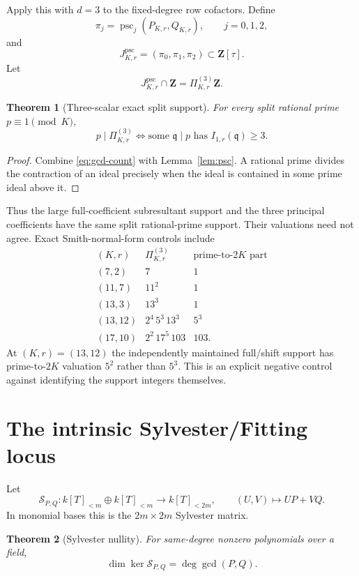 \documentclass[11pt]{article}
\newtheorem{theorem}{Theorem}[section]
\begin{document}
Apply this with $d=3$ to the fixed-degree row cofactors.  Define
\[
\pi_j=\operatorname{psc}_j(P_{K,r},Q_{K,r}),
\qquad j=0,1,2,
\]
and
\[
J^{\mathrm{psc}}_{K,r}=(\pi_0,\pi_1,\pi_2)
 \subset\mathbf Z[\tau].
\]
Let
\[
J^{\mathrm{psc}}_{K,r}\cap\mathbf Z
 =\Pi_{K,r}^{(3)}\mathbf Z.
\]

\begin{theorem}[Three-scalar exact split support]\label{thm:psc-support}
For every split rational prime $p\equiv1\pmod K$,
\[
p\mid\Pi_{K,r}^{(3)}
\iff
\text{some }\mathfrak q\mid p\text{ has }I_{1,r}(\mathfrak q)\ge3.
\]
\end{theorem}

\begin{proof}
Combine \eqref{eq:gcd-count} with Lemma~\ref{lem:psc}.  A rational prime divides
the contraction of an ideal precisely when the ideal is contained in some
prime ideal above it.
\end{proof}

Thus the large full-coefficient subresultant support and the three principal
coefficients have the same split rational-prime support.  Their valuations need
not agree.  Exact Smith-normal-form controls include
\[
\begin{array}{c|c|c}
(K,r)&\Pi_{K,r}^{(3)}&\text{prime-to-}2K\text{ part}\\\hline
(7,2)&7&1\\
(11,7)&11^2&1\\
(13,3)&13^3&1\\
(13,12)&2^4\,5^3\,13^3&5^3\\
(17,10)&2^2\,17^5\,103&103.
\end{array}
\]
At $(K,r)=(13,12)$ the independently maintained full/shift support has
prime-to-$2K$ valuation $5^2$ rather than $5^3$.  This is an explicit negative
control against identifying the support integers themselves.

\section{The intrinsic Sylvester/Fitting locus}

Let
\[
\mathcal S_{P,Q}:k[T]_{<m}\oplus k[T]_{<m}
 \longrightarrow k[T]_{<2m},
\qquad
(U,V)\mapsto UP+VQ.
\]
In monomial bases this is the $2m\times2m$ Sylvester matrix.

\begin{theorem}[Sylvester nullity]\label{thm:nullity}
For same-degree nonzero polynomials over a field,
\[
\dim\ker\mathcal S_{P,Q}=\deg\gcd(P,Q).
\]
\end{theorem}
\end{document}
